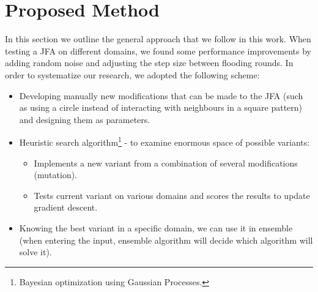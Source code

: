 \documentclass[format=acmsmall,screen,review,authordraft,nonacm]{acmart}
\begin{document}







\section{Proposed Method} %

In this section we outline the general approach that we follow in this work.
When testing a JFA on different domains, we found some performance improvements
by adding random noise and adjusting the step size between flooding rounds. In
order to systematize our research, we adopted the following scheme:

\begin{itemize}
	\item Developing manually new modifications that can be made to the JFA (such
		as using a circle instead of interacting with neighbours in a square
		pattern) and designing them as parameters.
	\item Heuristic search algorithm\footnote{Bayesian optimization
		using Gaussian Processes.} - to examine enormous space of possible variants:
		\begin{itemize}
			\item Implements a new variant from a combination of several
				modifications (mutation).
			\item Tests current variant on various domains and scores the results to update gradient descent.
		\end{itemize}
	\item Knowing the best variant in a specific domain, we can use it in ensemble (when entering the input, ensemble algorithm will decide which algorithm will solve it).
\end{itemize}
\end{document}
